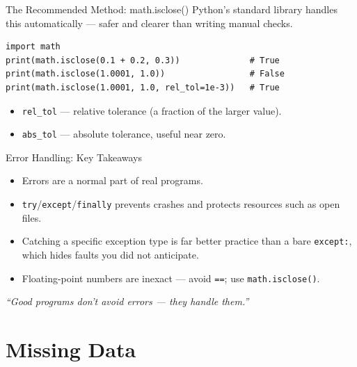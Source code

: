 \documentclass[9pt,aspectratio=169,xcolor=table]{beamer}
\begin{document}
\begin{frame}[fragile]{The Recommended Method: math.isclose()}
    \leavevmode
    Python's standard library handles this automatically --- safer and
    clearer than writing manual checks.

\begin{lstlisting}
import math
print(math.isclose(0.1 + 0.2, 0.3))              # True
print(math.isclose(1.0001, 1.0))                 # False
print(math.isclose(1.0001, 1.0, rel_tol=1e-3))   # True
\end{lstlisting}

    \vspace{2mm}
    \begin{itemize}
        \item \texttt{rel\_tol} --- relative tolerance (a fraction of
              the larger value).
        \item \texttt{abs\_tol} --- absolute tolerance, useful near
              zero.
    \end{itemize}
\end{frame}

\begin{frame}{Error Handling: Key Takeaways}
    \leavevmode
    \small
    \begin{itemize}
        \item Errors are a normal part of real programs.
        \item \texttt{try}/\texttt{except}/\texttt{finally} prevents
              crashes and protects resources such as open files.
        \item Catching a \alert{specific} exception type is far better
              practice than a bare \texttt{except:}, which hides
              faults you did not anticipate.
        \item Floating-point numbers are inexact --- avoid \texttt{==};
              use \texttt{math.isclose()}.
    \end{itemize}

    \vspace{3mm}
    \begin{center}
        \large\itshape\color{primary}
        ``Good programs don't avoid errors --- they handle them.''
    \end{center}
\end{frame}

\section{Missing Data}
\end{document}
